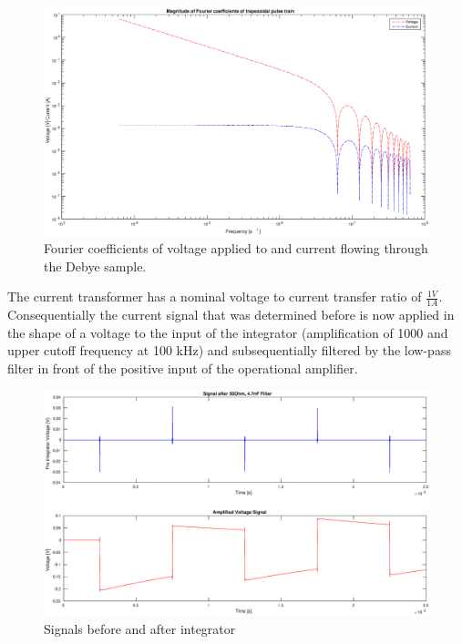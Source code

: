 \begin{figure}[h!tb]
\centerline{\includegraphics[width=\textwidth]{figures/Method/signal_simulation/fourierla.eps}}
\caption{Fourier coefficients of voltage applied to and current flowing through the Debye sample.}
\label{fig.fourierla}
\end{figure}

The current transformer has a nominal voltage to current transfer ratio of $\frac{1V}{1A}$. 
Consequentially the current signal that was determined before is now applied in the shape of a voltage to the input of the integrator (amplification of 1000 and upper cutoff frequency at 100 kHz) and subsequentially filtered by the low-pass filter in front of the positive input of the operational amplifier. 


\begin{figure}[h!tb]
\centerline{\includegraphics[width=\textwidth]{figures/Method/signal_simulation/integrated.eps}}
\caption{Signals before and after integrator}
\label{fig.integrator}
\end{figure}

